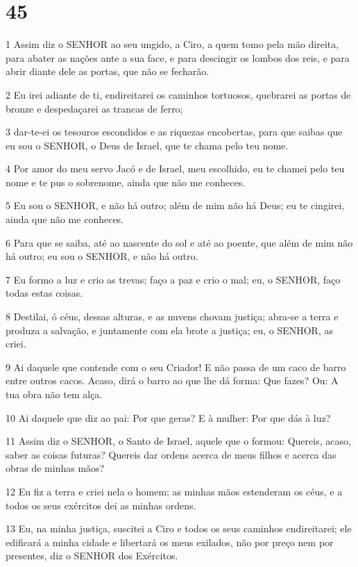 \chapter{45}

\par 1 Assim diz o SENHOR ao seu ungido, a Ciro, a quem tomo pela mão direita, para abater as nações ante a sua face, e para descingir os lombos dos reis, e para abrir diante dele as portas, que não se fecharão.
\par 2 Eu irei adiante de ti, endireitarei os caminhos tortuosos, quebrarei as portas de bronze e despedaçarei as trancas de ferro;
\par 3 dar-te-ei os tesouros escondidos e as riquezas encobertas, para que saibas que eu sou o SENHOR, o Deus de Israel, que te chama pelo teu nome.
\par 4 Por amor do meu servo Jacó e de Israel, meu escolhido, eu te chamei pelo teu nome e te pus o sobrenome, ainda que não me conheces.
\par 5 Eu sou o SENHOR, e não há outro; além de mim não há Deus; eu te cingirei, ainda que não me conheces.
\par 6 Para que se saiba, até ao nascente do sol e até ao poente, que além de mim não há outro; eu sou o SENHOR, e não há outro.
\par 7 Eu formo a luz e crio as trevas; faço a paz e crio o mal; eu, o SENHOR, faço todas estas coisas.
\par 8 Destilai, ó céus, dessas alturas, e as nuvens chovam justiça; abra-se a terra e produza a salvação, e juntamente com ela brote a justiça; eu, o SENHOR, as criei.
\par 9 Ai daquele que contende com o seu Criador! E não passa de um caco de barro entre outros cacos. Acaso, dirá o barro ao que lhe dá forma: Que fazes? Ou: A tua obra não tem alça.
\par 10 Ai daquele que diz ao pai: Por que geras? E à mulher: Por que dás à luz?
\par 11 Assim diz o SENHOR, o Santo de Israel, aquele que o formou: Quereis, acaso, saber as coisas futuras? Quereis dar ordens acerca de meus filhos e acerca das obras de minhas mãos?
\par 12 Eu fiz a terra e criei nela o homem; as minhas mãos estenderam os céus, e a todos os seus exércitos dei as minhas ordens.
\par 13 Eu, na minha justiça, suscitei a Ciro e todos os seus caminhos endireitarei; ele edificará a minha cidade e libertará os meus exilados, não por preço nem por presentes, diz o SENHOR dos Exércitos.
